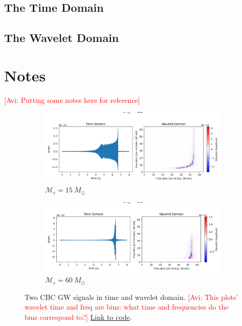 \documentclass{article}
\newcommand{\avi}[1]{\textcolor{red}{[Avi: #1]}}
\begin{document}
\subsection{The Time Domain}

\subsection{The Wavelet Domain}


\newpage
\appendix

\section{Notes}

\avi{Putting some notes here for reference}

\begin{figure}
  \centering

  \begin{subfigure}{0.5\textwidth}
    \centering
    \includegraphics[width=\linewidth]{figures/cbc_imrphenom_d/cbc_wavelet_mc_15.png}
    \caption{$\mathcal{M}_c=15\ M_{\odot}$}
  \end{subfigure}

  \begin{subfigure}{0.5\textwidth}
    \centering
    \includegraphics[width=\linewidth]{figures/cbc_imrphenom_d/cbc_wavelet_mc_60.png}
    \caption{$\mathcal{M}_c=60\ M_{\odot}$}
  \end{subfigure}

  \caption{Two CBC GW signals in time and wavelet domain. \avi{This plots' wavelet time and freq are bins: what time and frequencies do the bins correspond to?} \href{https://github.com/avivajpeyi/pywavelet/blob/main/docs/demos/cbc_demo.ipynb}{Link to code}.}
\end{figure}
\end{document}
